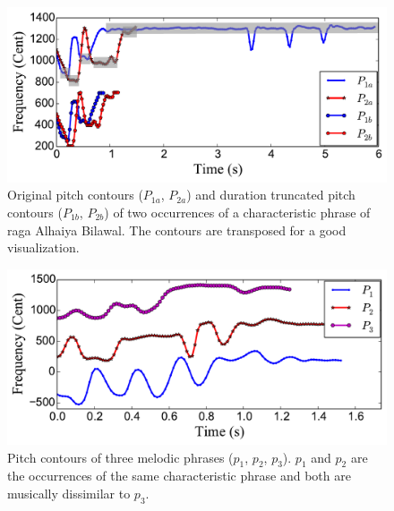 \begin{figure}
	\begin{center}
		\includegraphics[width=\figSizeEightyFive]{ch06_patterns/figures/ImprovingSimilarity/Hindusani_flat_note_compression_example_reversed.pdf}
	\end{center}
	\caption{Original pitch contours ($P_{1a}$, $P_{2a}$) and duration truncated pitch contours ($P_{1b}$, $P_{2b}$) of two occurrences of a characteristic phrase of \gls{raga} Alhaiya Bilawal. The contours are transposed for a good visualization.}
	\label{fig:flatCompressionExample}
\end{figure}

\begin{figure}
	\begin{center}
		\includegraphics[width=\figSizeEightyFive]{ch06_patterns/figures/ImprovingSimilarity/CarnaticComplexityExample.pdf}
	\end{center}
	\caption{Pitch contours of three melodic phrases ($p_1$, $p_2$, $p_3$). $p_1$ and $p_2$ are the occurrences of the same characteristic phrase and both are musically dissimilar to $p_3$.} 
	\label{fig:carnaticComplexityExample}
\end{figure}

